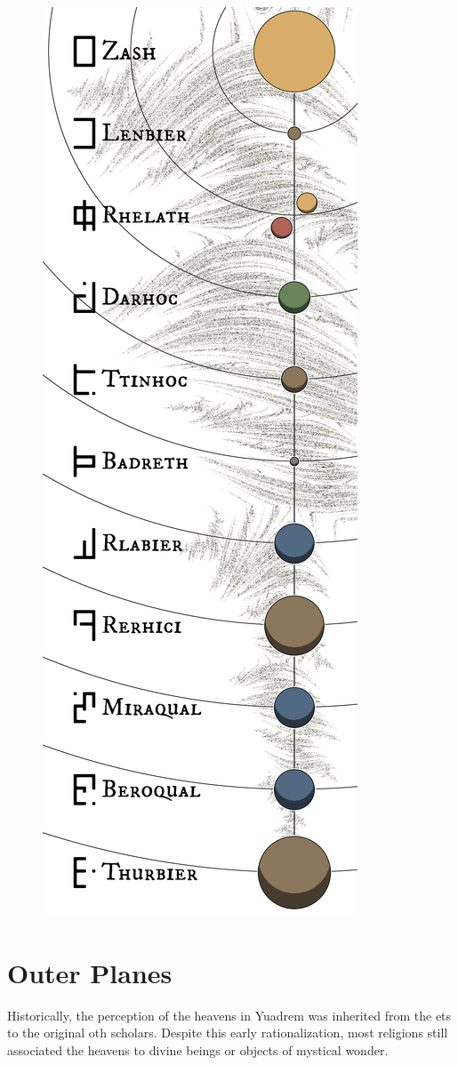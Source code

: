 \begin{figure}[H]
    \centering \includegraphics{01yuadrem/img/41solarsystem.png}
\end{figure}
\section{Outer Planes}
Historically, the perception of the heavens in Yuadrem was inherited from the ets to the original oth scholars.
Despite this early rationalization, most religions still associated the heavens to divine beings or objects of mystical wonder.





